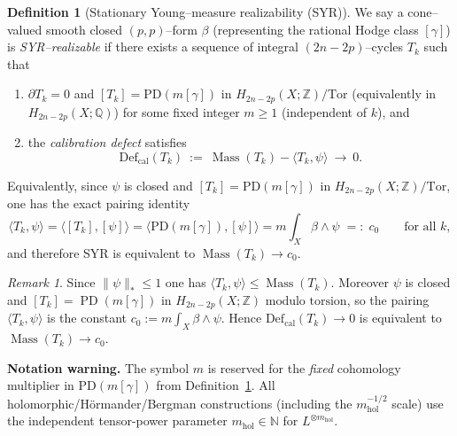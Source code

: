 \documentclass[11pt]{article}
\numberwithin{equation}{section}  %
\theoremstyle{plain}
\theoremstyle{definition}
\newtheorem{definition}[theorem]{Definition}
\theoremstyle{remark}
\newtheorem{remark}[theorem]{Remark}
\newcommand{\Z}{\mathbb{Z}}
\newcommand{\Q}{\mathbb{Q}}
\newcommand{\mhol}{m_{\mathrm{hol}}} %
\DeclareMathOperator{\Mass}{Mass}
\newcommand{\Def}{\mathrm{Def}}
\begin{document}
\begin{definition}[Stationary Young--measure realizability (SYR)]\label{def:syr}
We say a cone--valued smooth closed $(p,p)$--form $\beta$ (representing the rational Hodge class $[\gamma]$)
is \emph{SYR--realizable} if there exists a sequence of integral $(2n-2p)$--cycles $T_k$ such that
\begin{enumerate}
\item $\partial T_k=0$ and $[T_k]=\mathrm{PD}(m[\gamma])$ in $H_{2n-2p}(X;\Z)/\mathrm{Tor}$ (equivalently in $H_{2n-2p}(X;\Q)$) for some fixed integer $m\ge 1$ (independent of $k$), and
\item the \emph{calibration defect} satisfies
\[
\Def_{\mathrm{cal}}(T_k)\ :=\ \Mass(T_k)-\langle T_k,\psi\rangle\ \longrightarrow\ 0.
\]
\end{enumerate}
Equivalently, since $\psi$ is closed and $[T_k]=\mathrm{PD}(m[\gamma])$ in $H_{2n-2p}(X;\Z)/\mathrm{Tor}$, one has the exact pairing identity
\[
\langle T_k,\psi\rangle=\bigl\langle [T_k],[\psi]\bigr\rangle
=\bigl\langle \mathrm{PD}(m[\gamma]),[\psi]\bigr\rangle
=m\int_X \beta\wedge\psi \;=:\; c_0
\qquad\text{for all }k,
\]
and therefore SYR is equivalent to $\Mass(T_k)\to c_0$.

\end{definition}


\begin{remark}\label{rem:syr-criterion}
Since $\|\psi\|_*\le 1$ one has $\langle T_k,\psi\rangle\le \Mass(T_k)$. Moreover $\psi$ is closed and $[T_k]=\operatorname{PD}(m[\gamma])$ in $H_{2n-2p}(X;\Z)\text{ modulo torsion}$, so the pairing $\langle T_k,\psi\rangle$ is the constant $c_0:=m\int_X\beta\wedge\psi$. Hence $\Def_{\mathrm{cal}}(T_k)\to0$ is equivalent to $\Mass(T_k)\to c_0$.
\end{remark}



{\noindent\textbf{Notation warning.}
The symbol $m$ is reserved for the \emph{fixed} cohomology multiplier in $\mathrm{PD}(m[\gamma])$ from
Definition~\ref{def:syr}.  All holomorphic/H\"ormander/Bergman constructions (including the $\mhol^{-1/2}$ scale)
use the independent tensor-power parameter $\mhol\in\mathbb{N}$ for $L^{\otimes \mhol}$.}
\end{document}
